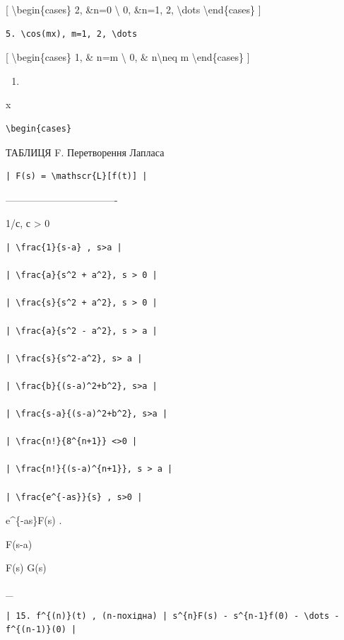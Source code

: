 \documentclass[
]{article}
\providecommand{\tightlist}{%
  \setlength{\itemsep}{0pt}\setlength{\parskip}{0pt}}
\begin{document}
{[} \textbackslash begin\{cases\} 2, \&n=0 \textbackslash{} 0, \&n=1, 2,
\textbackslash dots \textbackslash end\{cases\} {]}

\begin{verbatim}
5. \cos(mx), m=1, 2, \dots
\end{verbatim}

{[} \textbackslash begin\{cases\} 1, \& n=m \textbackslash{} 0, \&
n\textbackslash neq m \textbackslash end\{cases\} {]}

\begin{enumerate}
\def\labelenumi{\arabic{enumi}.}
\setcounter{enumi}{5}
\tightlist
\item
\end{enumerate}

x

\begin{verbatim}
\begin{cases}
\end{verbatim}

ТАБЛИЦЯ F. Перетворення Лапласа

\begin{verbatim}
| F(s) = \mathscr{L}[f(t)] |
\end{verbatim}

\textbar----------------------------------\textbar{}

1/с, с \textgreater{} 0 \textbar{}

\begin{verbatim}
| \frac{1}{s-a} , s>a |

| \frac{a}{s^2 + a^2}, s > 0 |

| \frac{s}{s^2 + a^2}, s > 0 |

| \frac{a}{s^2 - a^2}, s > a |

| \frac{s}{s^2-a^2}, s> a |

| \frac{b}{(s-a)^2+b^2}, s>a |

| \frac{s-a}{(s-a)^2+b^2}, s>a |

| \frac{n!}{8^{n+1}} <>0 |

| \frac{n!}{(s-a)^{n+1}}, s > a |

| \frac{e^{-as}}{s} , s>0 |
\end{verbatim}

e\^{}\{-as\}F(s) . \textbar{}

F(s-a) \textbar{}

F(s) G(s) \textbar{}

\_ \textbar{}

\begin{verbatim}
| 15. f^{(n)}(t) , (n-похідна) | s^{n}F(s) - s^{n-1}f(0) - \dots - f^{(n-1)}(0) |
\end{verbatim}
\end{document}
